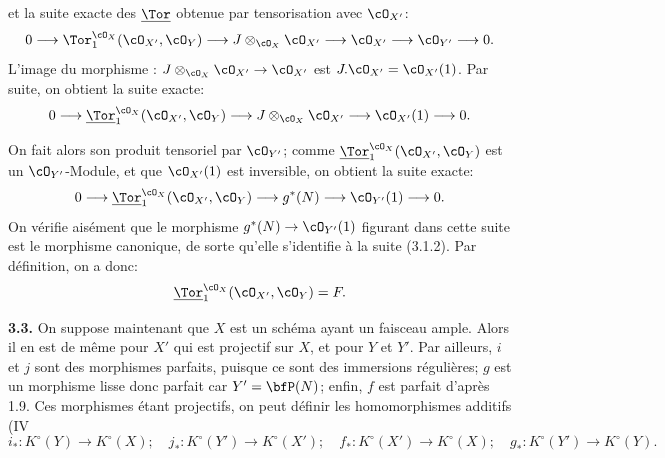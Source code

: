 et la
suite exacte des \(\underline{\Tor}\) obtenue par tensorisation avec \(\cO_{X'}\):
\[
0\longrightarrow
\Tor_1^{\cO_X}(\cO_{X'},\cO_Y)
\longrightarrow
J\otimes_{\cO_X}\cO_{X'}
\longrightarrow
\cO_{X'}
\longrightarrow
\cO_{Y'}
\longrightarrow0.
\]
L'image du morphisme : \(J\otimes_{\cO_X}\cO_{X'}\to\cO_{X'}\) est
\(J.\cO_{X'}=\cO_{X'}(1)\). Par suite, on obtient la suite exacte:
\[
0\longrightarrow
\underline{\Tor}_1^{\cO_X}(\cO_{X'},\cO_Y)
\longrightarrow
J\otimes_{\cO_X}\cO_{X'}
\longrightarrow
\cO_{X'}(1)
\longrightarrow0.
\]

On fait alors son produit tensoriel par \(\cO_{Y'}\); comme
\(\underline{\Tor}_1^{\cO_X}(\cO_{X'},\cO_Y)\) est un \(\cO_{Y'}\)-Module, et que
\(\cO_{X'}(1)\) est inversible, on obtient la suite exacte:
\[
0\longrightarrow
\underline{\Tor}_1^{\cO_X}(\cO_{X'},\cO_Y)
\longrightarrow
g^*(N)
\longrightarrow
\cO_{Y'}(1)
\longrightarrow0.
\]
On vérifie aisément que le morphisme \(g^*(N)\to\cO_{Y'}(1)\) figurant dans cette suite est le morphisme canonique, de sorte qu'elle s'identifie à la suite (3.1.2). Par définition, on a donc:
\[
\underline{\Tor}_1^{\cO_X}(\cO_{X'},\cO_Y)=F.
\]

\textbf{3.3.} On suppose maintenant que \(X\) est un schéma ayant un faisceau ample. Alors il en est de même pour \(X'\) qui est projectif sur \(X\), et pour \(Y\) et \(Y'\). Par ailleurs, \(i\) et \(j\) sont des morphismes parfaits, puisque ce sont des immersions régulières; \(g\) est un morphisme lisse donc parfait car \(Y'=\bfP(N)\); enfin, \(f\) est parfait d'après 1.9. Ces morphismes étant projectifs, on peut définir les homomorphismes additifs (IV
\[
i_*:K^\circ(Y)\to K^\circ(X);\quad
j_*:K^\circ(Y')\to K^\circ(X');\quad
f_*:K^\circ(X')\to K^\circ(X);\quad
g_*:K^\circ(Y')\to K^\circ(Y).
\]

